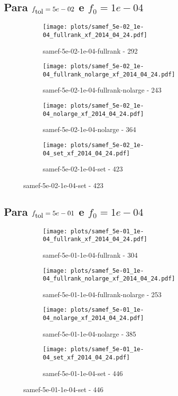 \newpage
\subsection{Para $f_{\mbox{tol}} = 5e-02$ e $f_0 = 1e-04$}

\begin{figure}[H]
  \centering
  \begin{subfigure}{0.48\textwidth}
    \texttt{[image: plots/samef\_5e-02\_1e-04\_fullrank\_xf\_2014\_04\_24.pdf]}
    \caption{samef-5e-02-1e-04-fullrank - 292}
  \end{subfigure}
  \begin{subfigure}{0.48\textwidth}
    \texttt{[image: plots/samef\_5e-02\_1e-04\_fullrank\_nolarge\_xf\_2014\_04\_24.pdf]}
    \caption{samef-5e-02-1e-04-fullrank-nolarge - 243}
  \end{subfigure}
  \begin{subfigure}{0.48\textwidth}
    \texttt{[image: plots/samef\_5e-02\_1e-04\_nolarge\_xf\_2014\_04\_24.pdf]}
    \caption{samef-5e-02-1e-04-nolarge - 364}
  \end{subfigure}
  \begin{subfigure}{0.48\textwidth}
    \texttt{[image: plots/samef\_5e-02\_1e-04\_set\_xf\_2014\_04\_24.pdf]}
    \caption{samef-5e-02-1e-04-set - 423}
  \end{subfigure}
\end{figure}

\newpage
\subsection{Para $f_{\mbox{tol}} = 5e-01$ e $f_0 = 1e-04$}

\begin{figure}[H]
  \centering
  \begin{subfigure}{0.48\textwidth}
    \texttt{[image: plots/samef\_5e-01\_1e-04\_fullrank\_xf\_2014\_04\_24.pdf]}
    \caption{samef-5e-01-1e-04-fullrank - 304}
  \end{subfigure}
  \begin{subfigure}{0.48\textwidth}
    \texttt{[image: plots/samef\_5e-01\_1e-04\_fullrank\_nolarge\_xf\_2014\_04\_24.pdf]}
    \caption{samef-5e-01-1e-04-fullrank-nolarge - 253}
  \end{subfigure}
  \begin{subfigure}{0.48\textwidth}
    \texttt{[image: plots/samef\_5e-01\_1e-04\_nolarge\_xf\_2014\_04\_24.pdf]}
    \caption{samef-5e-01-1e-04-nolarge - 385}
  \end{subfigure}
  \begin{subfigure}{0.48\textwidth}
    \texttt{[image: plots/samef\_5e-01\_1e-04\_set\_xf\_2014\_04\_24.pdf]}
    \caption{samef-5e-01-1e-04-set - 446}
  \end{subfigure}
\end{figure}

